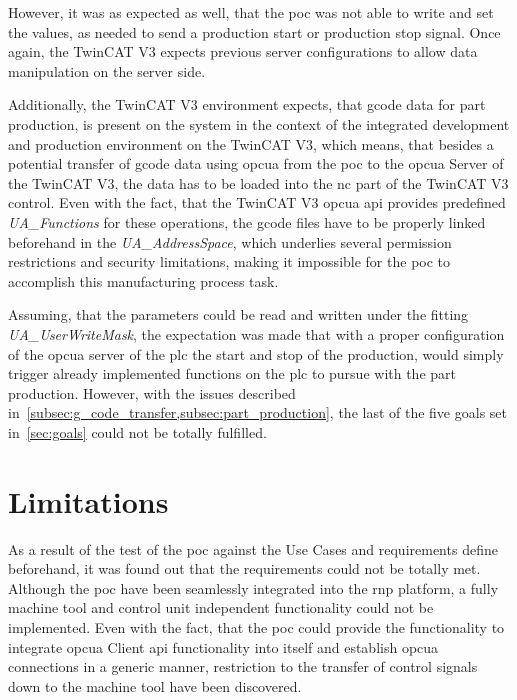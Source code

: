 \documentclass[
a4paper,
twoside,
headsepline,
cleardoublepage=empty,
parskip=half,
draft=false
]{scrbook}
\begin{document}
				However, it was as expected as well, that the \gls{poc} was not able to write and set the values, as needed to send a production start or production stop signal. 
				Once again, the TwinCAT V3 expects previous server configurations to allow data manipulation on the server side. 
				
				Additionally, the TwinCAT V3 environment expects, that \gls{gcode} data for part production, is present on the system in the context of the integrated development and production environment on the TwinCAT V3, which means, that besides a potential transfer of \gls{gcode} data using \gls{opcua} from the \gls{poc} to the \gls{opcua} Server of the TwinCAT V3, the data has to be loaded into 	the \gls{nc} part of the TwinCAT V3 control. 
				Even with the fact, that the TwinCAT V3 \gls{opcua} \gls{api} provides predefined \textit{UA\_Functions} for these operations, the \gls{gcode} files have to be properly linked beforehand in the \textit{UA\_AddressSpace}, which underlies several permission restrictions and security limitations, making it impossible for the \gls{poc} to accomplish this manufacturing process task.

				Assuming, that the parameters could be read and written under the fitting \textit{UA\_UserWriteMask}, the expectation was made that with a proper configuration of the \gls{opcua} server of the \gls{plc} the start and stop of the production, would simply trigger already implemented functions on the \gls{plc} to pursue with the part production. 
				However, with the issues described in~\cref{subsec:g_code_transfer,subsec:part_production}, the last of the five goals set in~\cref{sec:goals} could not be totally fulfilled.

		\section{Limitations}\label{sec:limitations}

			As a result of the test of the \gls{poc} against the Use Cases and requirements define beforehand, it was found out that the requirements could not be totally met.
			Although the \gls{poc} have been seamlessly integrated into the \gls{rnp} platform, a fully machine tool and control unit independent functionality could not be implemented. 
			Even with the fact, that the \gls{poc} could provide the functionality to integrate \gls{opcua} Client \gls{api} functionality into itself and establish \gls{opcua} connections in a generic manner, restriction to the transfer of control signals down to the machine tool have been discovered.
			
\end{document}
